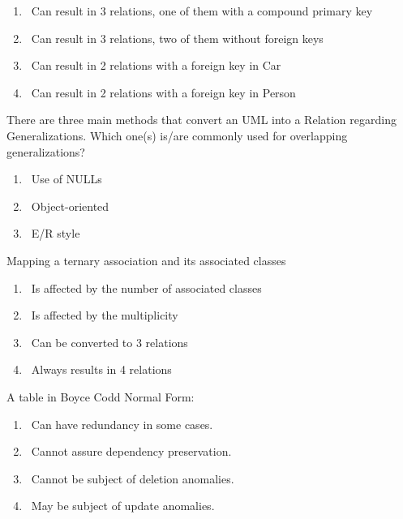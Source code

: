 \documentclass{bdad}
\begin{document}
\begin{enumerate}
    \item \boxedredcross      ~Can result in 3 relations, one of them with a compound primary key
    \item \boxedgreencheckmark~Can result in 3 relations, two of them without foreign keys
    \item \boxedgreencheckmark~Can result in 2 relations with a foreign key in Car
    \item \boxedredcross      ~Can result in 2 relations with a foreign key in Person
\end{enumerate}

There are three main methods that convert an UML into a Relation regarding Generalizations. Which one(s) is/are commonly used for overlapping generalizations?

\begin{enumerate}
    \item \boxedgreencheckmark~Use of NULLs
    \item \boxedredcross      ~Object-oriented
    \item \boxedgreencheckmark~E/R style
\end{enumerate}

Mapping a ternary association and its associated classes

\begin{enumerate}
    \item \boxedredcross      ~Is affected by the number of associated classes
    \item \boxedgreencheckmark~Is affected by the multiplicity
    \item \boxedredcross      ~Can be converted to 3 relations
    \item \boxedgreencheckmark~Always results in 4 relations
\end{enumerate}

A table in Boyce Codd Normal Form:

\begin{enumerate}
    \item \boxedredcross      ~Can have redundancy in some cases.
    \item \boxedgreencheckmark~Cannot assure dependency preservation.
    \item \boxedgreencheckmark~Cannot be subject of deletion anomalies.
    \item \boxedredcross      ~May be subject of update anomalies.
\end{enumerate}
\end{document}
